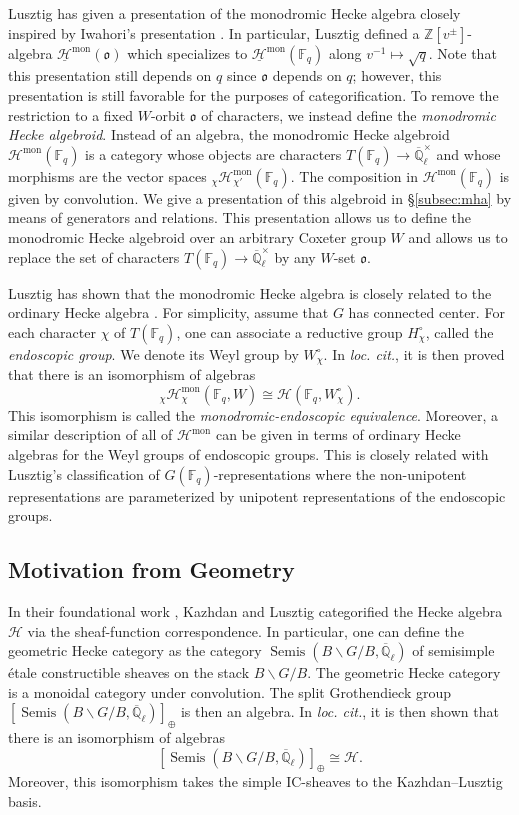 \documentclass{amsart}
\newcommand{\Q}{\mathbb{Q}}
\newcommand{\Z}{\mathbb{Z}}
\newcommand{\F}{\mathbb{F}}
\newcommand{\scrH}{\mathcal{H}}
\DeclareMathOperator{\Semis}{Semis}
\newcommand{\fr}[1]{\mathfrak{#1}}
\DeclareMathOperator{\mon}{mon}
\newcommand{\BGB}{B \backslash G/B}
\theoremstyle{definition}
\numberwithin{equation}{subsection}
\begin{document}
Lusztig has given a presentation of the monodromic Hecke algebra closely inspired by Iwahori's presentation \cite{Lus16}. 
In particular, Lusztig defined a $\Z [v^{\pm}]$-algebra $\underline{\scrH}^{\mon} (\fr{o})$ which specializes to $\underline{\scrH}^{\mon} (\F_q)$ along $v^{-1} \mapsto \sqrt{q}$.
Note that this presentation still depends on $q$ since $\fr{o}$ depends on $q$; however, this presentation is still favorable for the purposes of categorification.
To remove the restriction to a fixed $W$-orbit $\fr{o}$ of characters, we instead define the \emph{monodromic Hecke algebroid}.
Instead of an algebra, the monodromic Hecke algebroid $\scrH^{\mon} (\F_q)$ is a category whose objects are characters $T (\F_q) \to \overline{\Q}_{\ell}^{\times}$ and whose morphisms are the vector spaces ${}_{\chi} \scrH_{\chi'}^{\mon} (\F_q)$.
The composition in $\scrH^{\mon} (\F_q)$ is given by convolution. 
We give a presentation of this algebroid in \S\ref{subsec:mha} by means of generators and relations.
This presentation allows us to define the monodromic Hecke algebroid over an arbitrary Coxeter group $W$ and allows us to replace the set of characters $T (\F_q) \to \overline{\Q}_{\ell}^{\times}$ by any $W$-set $\fr{o}$.

Lusztig has shown that the monodromic Hecke algebra is closely related to the ordinary Hecke algebra \cite{Lus19}.
For simplicity, assume that $G$ has connected center.
For each character $\chi$ of $T (\F_q)$, one can associate a reductive group $H_{\chi}^{\circ}$, called the \emph{endoscopic group}. We denote its Weyl group by $W_{\chi}^{\circ}$.
In \emph{loc. cit.}, it is then proved that there is an isomorphism of algebras
\[{}_{\chi} \scrH_{\chi}^{\mon} (\F_q, W) \cong \scrH (\F_q, W_{\chi}^{\circ}).\]
This isomorphism is called the \emph{monodromic-endoscopic equivalence}.
Moreover, a similar description of all of $\scrH^{\mon}$ can be given in terms of ordinary Hecke algebras for the Weyl groups of endoscopic groups.
This is closely related with Lusztig's classification of $G(\F_q)$-representations where the non-unipotent representations are parameterized by unipotent representations of the endoscopic groups.  

\subsection{Motivation from Geometry}

In their foundational work \cite{KL}, Kazhdan and Lusztig categorified the Hecke algebra $\scrH$ via the sheaf-function correspondence. 
In particular, one can define the geometric Hecke category as the category $\Semis (\BGB, \overline{\Q}_{\ell})$
of semisimple étale constructible sheaves on the stack $\BGB$. 
The geometric Hecke category is a monoidal category under convolution. 
The split Grothendieck group $[\Semis (\BGB, \overline{\Q}_\ell)]_{\oplus}$ is then an algebra. In \emph{loc. cit.}, it is then shown that there is an isomorphism of algebras
\[[ \Semis (\BGB, \overline{\Q}_\ell) ]_{\oplus} \cong \scrH.\]
Moreover, this isomorphism takes the simple IC-sheaves to the Kazhdan--Lusztig basis. 
\end{document}
